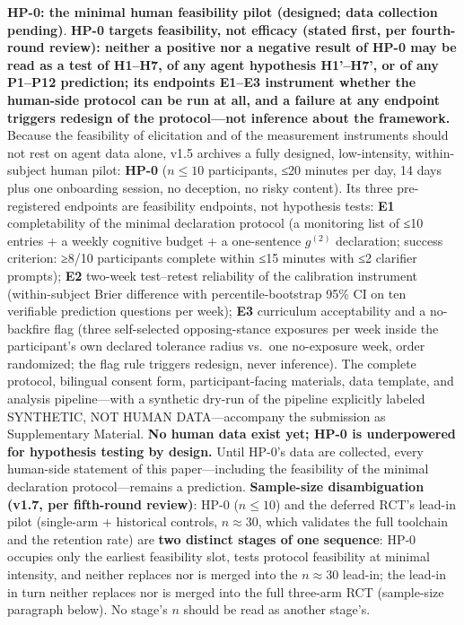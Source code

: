 \documentclass[
  11pt]{article}
\begin{document}
\textbf{HP-0: the minimal human feasibility pilot (designed; data
collection pending)}. \textbf{HP-0 targets feasibility, not efficacy
(stated first, per fourth-round review): neither a positive nor a
negative result of HP-0 may be read as a test of H1--H7, of any agent
hypothesis H1'--H7', or of any P1--P12 prediction; its endpoints E1--E3
instrument whether the human-side protocol can be run at all, and a
failure at any endpoint triggers redesign of the protocol---not
inference about the framework.} Because the feasibility of elicitation
and of the measurement instruments should not rest on agent data alone,
v1.5 archives a fully designed, low-intensity, within-subject human
pilot: \textbf{HP-0} (\(n \le 10\) participants, ≤20 minutes per day, 14
days plus one onboarding session, no deception, no risky content). Its
three pre-registered endpoints are feasibility endpoints, not hypothesis
tests: \textbf{E1} completability of the minimal declaration protocol (a
monitoring list of ≤10 entries + a weekly cognitive budget + a
one-sentence \(g^{(2)}\) declaration; success criterion: ≥8/10
participants complete within ≤15 minutes with ≤2 clarifier prompts);
\textbf{E2} two-week test--retest reliability of the calibration
instrument (within-subject Brier difference with percentile-bootstrap
95\% CI on ten verifiable prediction questions per week); \textbf{E3}
curriculum acceptability and a no-backfire flag (three self-selected
opposing-stance exposures per week inside the participant's own declared
tolerance radius vs.~one no-exposure week, order randomized; the flag
rule triggers redesign, never inference). The complete protocol,
bilingual consent form, participant-facing materials, data template, and
analysis pipeline---with a synthetic dry-run of the pipeline explicitly
labeled SYNTHETIC, NOT HUMAN DATA---accompany the submission as
Supplementary Material. \textbf{No human data exist yet; HP-0 is
underpowered for hypothesis testing by design.} Until HP-0's data are
collected, every human-side statement of this paper---including the
feasibility of the minimal declaration protocol---remains a prediction.
\textbf{Sample-size disambiguation (v1.7, per fifth-round review)}: HP-0
(\(n \le 10\)) and the deferred RCT's lead-in pilot (single-arm +
historical controls, \(n \approx 30\), which validates the full
toolchain and the retention rate) are \textbf{two distinct stages of one
sequence}: HP-0 occupies only the earliest feasibility slot, tests
protocol feasibility at minimal intensity, and neither replaces nor is
merged into the \(n \approx 30\) lead-in; the lead-in in turn neither
replaces nor is merged into the full three-arm RCT (sample-size
paragraph below). No stage's \(n\) should be read as another stage's.
\end{document}
